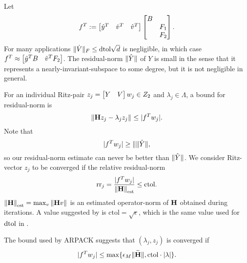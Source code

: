 Let
\[
 f^T:=\begin{bmatrix} \hat{y}^T  & \dot{v}^T   & \hat{v}^T \end{bmatrix}\begin{bmatrix} B&\\&F_1\\&F_2\end{bmatrix}.
\]
For many  applications $\| \dot{V} \|_F\leq \text{dtol} \sqrt{d}$ is negligible, in which case $f^T \approx \begin{bmatrix} \hat{y}^T B & \hat{v}^T F_2\end{bmatrix}$.  The residual-norm $\| \hat{Y} \|$ of $Y$ is small in the sense that it represents a nearly-invariant-subspace  to some degree, but it is not negligible in general. 

 
  For an individual Ritz-pair $z_j=\begin{bmatrix} Y&V\end{bmatrix}w_j\in Z_2$ and $\lambda_j\in\Lambda$, a bound for residual-norm is
\begin{equation}
\left\| \textbf{\textup{H}} z_j - \lambda_j z_j \right\|_{} \leq |f^T w_j|.
\label{eq:ritz_resid_bound1}
\end{equation}
Note that 
\[
|f^T w_j| \geq \| \| \hat{Y} \|,
\]
so our residual-norm estimate can never be better than $\| \hat{Y}\|$.
We consider Ritz-vector $z_j$ to be converged if the relative residual-norm
\begin{equation}
\text{rr}_j = \frac{|f^T w_j|}{\left\| \textbf{\textup{H}} \right\|_{\text{est}}} \leq \text{ctol}.
\label{eq:rr_band1}
\end{equation}
 $\left\| \textbf{\textup{H}} \right\|_{\text{est}}=\max_{v}\left\| \textbf{\textup{H}} v \right\|_{}$ is an estimated operator-norm of $\textbf{\textup{H}}$ obtained during iterations.   A value suggested by \cite{parlett1979lanczos}  is $\text{ctol}=\sqrt{\epsilon}$, which is the same value used for $\text{dtol}$ in \cite{AN}.   

The bound used by ARPACK suggests that $(\lambda_j,z_j)$ is converged if   
\[
|f^T w_j| \leq \max\{ \epsilon_M \| \widetilde{\textbf{\textup{H}}} \|, \text{ctol}\cdot  |\lambda| \}.
\]



